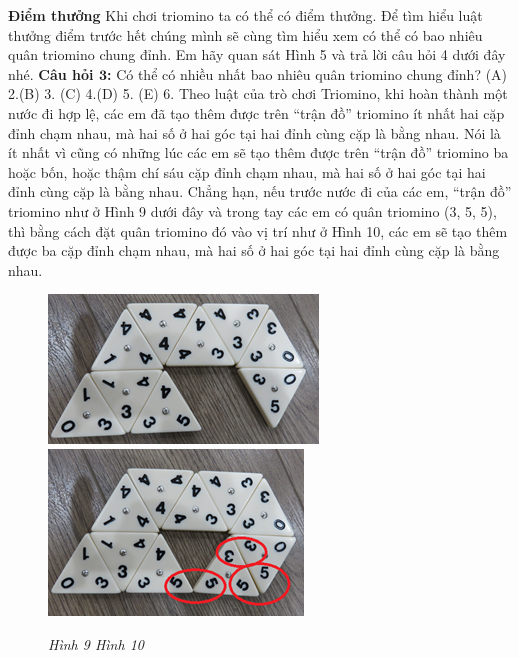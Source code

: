 \newpage
\graphicspath{ {../choicungbi/domino2/} }

	{\bf {Điểm thưởng}}   
	\vskip 0.1cm
	Khi chơi triomino ta có thể có điểm thưởng.  Để tìm hiểu luật thưởng điểm trước hết chúng mình sẽ  cùng tìm hiểu xem có thể có bao nhiêu quân triomino chung đỉnh. Em hãy quan sát Hình 5 và trả lời câu hỏi 4 dưới  đây nhé.
	\vskip 0.1cm
	\textbf{Câu hỏi $\pmb{3}$:}
	\vskip 0.1cm
	Có thể có nhiều nhất bao nhiêu quân triomino chung đỉnh?
	\vskip 0.1cm
	\hspace*{0pt}(A)  2.\hspace*{35pt}(B)  3.
	\hspace*{35pt}(C)  4.\hspace*{35pt}(D)  5.
	\hspace*{35pt}(E)  6.
	\vskip 0.1cm
	Theo luật của trò chơi Triomino, khi hoàn thành một nước đi hợp lệ, các em đã tạo thêm được trên “trận đồ” triomino ít nhất hai cặp đỉnh chạm nhau, mà hai số ở hai góc tại hai đỉnh cùng cặp là bằng nhau. Nói là ít nhất vì cũng có những lúc các em sẽ tạo thêm được trên “trận đồ” triomino ba hoặc bốn, hoặc thậm chí sáu cặp đỉnh chạm nhau, mà hai số ở hai góc tại hai đỉnh cùng cặp là bằng nhau. Chẳng hạn, nếu trước nước đi của các em, “trận đồ” triomino như ở Hình 9 dưới đây và trong tay các em có quân triomino  (3, 5, 5), thì bằng cách đặt quân triomino đó vào vị trí như ở Hình 10, các em sẽ tạo thêm được ba cặp đỉnh chạm nhau, mà hai số ở hai góc tại hai đỉnh cùng cặp là bằng nhau.
	\begin{figure}[H]
		\centering
		\vspace*{-5pt}
		\captionsetup{labelformat=empty, justification=centering}
		\includegraphics[height=0.2\textwidth]{h7a}\quad
		\includegraphics[height=0.2\textwidth]{h8a}
		\caption{\textit{\small Hình 9 \hspace*{75pt} Hình 10}}
		\vspace*{-10pt}
	\end{figure}
